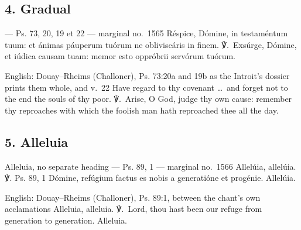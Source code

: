 \elementguard
\subsection*{4. Gradual }

\begin{appointedlatin}{ --- Ps. 73, 20, 19 et 22 --- marginal no.\ 1565}
Réspice, Dómine, in testaméntum tuum: et ánimas páuperum tuórum ne
obliviscáris in finem. ℣.~Exsúrge, Dómine, et iúdica causam tuam: memor esto
oppróbrii servórum tuórum.
\end{appointedlatin}

\begin{namedtranslation}{English: Douay--Rheims (Challoner), Ps. 73:20a and 19b as the Introit's dossier prints them whole, and v.~22}
Have regard to thy covenant \dots\ and forget not to the end the souls of thy
poor. ℣.~Arise, O God, judge thy own cause: remember thy reproaches with which
the foolish man hath reproached thee all the day.
\end{namedtranslation}


\elementguard
\subsection*{5. Alleluia }

\begin{appointedlatin}{Alleluia, no separate heading --- Ps. 89, 1 --- marginal no.\ 1566}
Allelúia, allelúia. ℣. \textnormal{Ps. 89, 1} Dómine, refúgium factus es nobis
a generatióne et progénie. Allelúia.
\end{appointedlatin}

\begin{namedtranslation}{English: Douay--Rheims (Challoner), Ps. 89:1, between the chant's own acclamations}
Alleluia, alleluia. ℣.~Lord, thou hast been our refuge from generation to
generation. Alleluia.
\end{namedtranslation}

